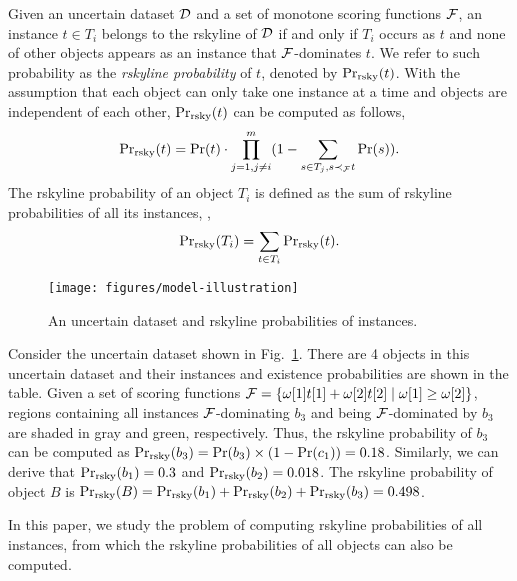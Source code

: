 Given an uncertain dataset $\mathcal{D}$ and a set of monotone scoring functions $\mathcal{F}$, an instance $t \in T_i$ belongs to the rskyline of $\mathcal{D}$ if and only if $T_i$ occurs as $t$ and none of other objects appears as an instance that $\mathcal{F}$-dominates $t$.
We refer to such probability as the \textit{rskyline probability} of $t$, denoted by $\Pr_{\rm rsky}(t)$.
With the assumption that each object can only take one instance at a time and objects are independent of each other, $\Pr_{\rm rsky}(t)$ can be computed as follows,
\begin{equation}\label{eq:rskyprob-def}
	\mathrm{Pr}_{\rm rsky}(t) = \Pr(t) \cdot \prod_{j = 1, j \ne i}^m(1 - \sum_{s \in T_j, s \prec_{\mathcal{F}} t} \Pr(s)).
\end{equation}
The rskyline probability of an object $T_i$ is defined as the sum of rskyline probabilities of all its instances, \ie,
\begin{equation}
	\mathrm{Pr}_{\rm rsky}(T_i) = \sum_{t \in T_i} \mathrm{Pr}_{\rm rsky}(t).
\end{equation}

\begin{figure}[t]
	\texttt{[image: figures/model-illustration]}\vspace{-2mm}
	\caption{An uncertain dataset and rskyline probabilities of instances.}
	\vspace{-2mm}
	\label{fig:model-illustration}
\end{figure}

\begin{example}
	Consider the uncertain dataset shown in Fig.~\ref{fig:model-illustration}.
	There are 4 objects in this uncertain dataset and their instances and existence probabilities are shown in the table.
	Given a set of scoring functions $\mathcal{F} = \{\omega[1]t[1] + \omega[2]t[2] \mid \omega[1] \ge \omega[2]\}$, regions containing all instances $\mathcal{F}$-dominating $b_3$ and being $\mathcal{F}$-dominated by $b_3$ are shaded in gray and green, respectively.
	Thus, the rskyline probability of $b_3$ can be computed as $\Pr_{\rm rsky}(b_3) = \Pr(b_3) \times (1 - \Pr(c_1)) = 0.18$.
	Similarly, we can derive that $\Pr_{\rm rsky}(b_1) = 0.3$ and $\Pr_{\rm rsky}(b_2) = 0.018$.
	The rskyline probability of object $B$ is $\Pr_{\rm rsky}(B) = \Pr_{\rm rsky}(b_1) + \Pr_{\rm rsky}(b_2) + \Pr_{\rm rsky}(b_3) = 0.498$.
\end{example}

In this paper, we study the problem of computing rskyline probabilities of all instances, from which the rskyline probabilities of all objects can also be computed.

